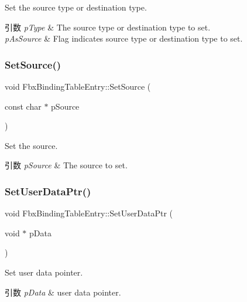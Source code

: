 Set the source type or destination type. 
\begin{DoxyParams}{引数}
{\em p\+Type} & The source type or destination type to set. \\
\hline
{\em p\+As\+Source} & Flag indicates source type or destination type to set. \\
\hline
\end{DoxyParams}
\mbox{\label{class_fbx_binding_table_entry_abd6159bc2bfa28f28a5b5bd0a5e63c97}} 
\subsubsection{\texorpdfstring{Set\+Source()}{SetSource()}}
{\footnotesize\ttfamily void Fbx\+Binding\+Table\+Entry\+::\+Set\+Source (\begin{DoxyParamCaption}\item[{const char $\ast$}]{p\+Source }\end{DoxyParamCaption})}

Set the source. 
\begin{DoxyParams}{引数}
{\em p\+Source} & The source to set. \\
\hline
\end{DoxyParams}
\mbox{\label{class_fbx_binding_table_entry_aea364cf8ef84414bf9524636e8407498}} 
\subsubsection{\texorpdfstring{Set\+User\+Data\+Ptr()}{SetUserDataPtr()}}
{\footnotesize\ttfamily void Fbx\+Binding\+Table\+Entry\+::\+Set\+User\+Data\+Ptr (\begin{DoxyParamCaption}\item[{void $\ast$}]{p\+Data }\end{DoxyParamCaption})}

Set user data pointer. 
\begin{DoxyParams}{引数}
{\em p\+Data} & user data pointer. \\
\hline
\end{DoxyParams}


